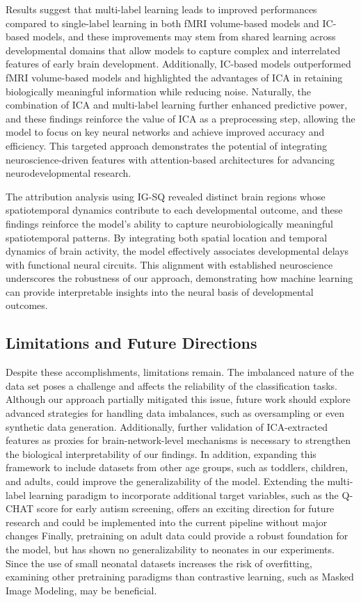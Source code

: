 \documentclass[runningheads,a4paper]{llncs}
\begin{document}
Results suggest that multi-label learning leads to improved performances compared to single-label learning in both fMRI volume-based models and IC-based models, and these improvements may stem from shared learning across developmental domains that allow models to capture complex and interrelated features of early brain development. Additionally, IC-based models outperformed fMRI volume-based models and highlighted the advantages of ICA in retaining biologically meaningful information while reducing noise. Naturally, the combination of ICA and multi-label learning further enhanced predictive power, and these findings reinforce the value of ICA as a preprocessing step, allowing the model to focus on key neural networks and achieve improved accuracy and efficiency. This targeted approach demonstrates the potential of integrating neuroscience-driven features with attention-based architectures for advancing neurodevelopmental research.
%

The attribution analysis using IG-SQ revealed distinct brain regions whose spatiotemporal dynamics contribute to each developmental outcome, and these findings reinforce the model's ability to capture neurobiologically meaningful spatiotemporal patterns. By integrating both spatial location and temporal dynamics of brain activity, the model effectively associates developmental delays with functional neural circuits. This alignment with established neuroscience underscores the robustness of our approach, demonstrating how machine learning can provide interpretable insights into the neural basis of developmental outcomes.

\subsection{Limitations and Future Directions}
%
Despite these accomplishments, limitations remain. The imbalanced nature of the data set poses a challenge and affects the reliability of the classification tasks. Although our approach partially mitigated this issue, future work should explore advanced strategies for handling data imbalances, such as oversampling or even synthetic data generation. Additionally, further validation of ICA-extracted features as proxies for brain-network-level mechanisms is necessary to strengthen the biological interpretability of our findings. In addition, expanding this framework to include datasets from other age groups, such as toddlers, children, and adults, could improve the generalizability of the model. Extending the multi-label learning paradigm to incorporate additional target variables, such as the Q-CHAT score for early autism screening, offers an exciting direction for future research and could be implemented into the current pipeline without major changes Finally, pretraining on adult data could provide a robust foundation for the model, but has shown no generalizability to neonates in our experiments. Since the use of small neonatal datasets increases the risk of overfitting, examining other pretraining paradigms than contrastive learning, such as Masked Image Modeling, may be beneficial.
\end{document}

